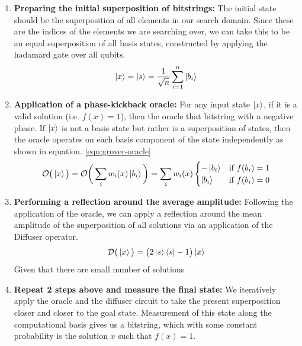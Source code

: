 \begin{enumerate}
    \item \textbf{Preparing the initial superposition of bitstrings:} The initial state should be the superposition of all elements in our search domain. Since these are the indices of the elements we are searching over, we can take this to be an equal superposition of all basis states, constructed by applying the hadamard gate over all qubits.
    \begin{equation}
        \ket{x} = \ket{s} = \frac{1}{\sqrt{n}} \sum_{i=1}^{n} \ket{b_i}
    \end{equation}

    \item \textbf{Application of a phase-kickback oracle:} For any input state $\ket{x}$, if it is a valid solution (i.e. $f(x) = 1$), then the oracle that bitstring with a negative phase. If $\ket{x}$ is not a basis state but rather is a superposition of states, then the oracle operates on each basis component of the state independently as shown in equation. \ref{eqn:grover-oracle}
    \begin{equation}\label{eqn:grover-oracle}
        \mathcal{O} \big(\ket{x} \big) = \mathcal{O}\bigg(\sum_i w_i(x) \ket{b_i} \bigg) = \sum_i w_i(x) \begin{cases}
            -\ket{b_i} & \text{if } f(b_i) = 1 \\
            \ket{b_i} & \text{if } f(b_i) = 0
        \end{cases}
    \end{equation}
    
    \item \textbf{Performing a reflection around the average amplitude:} Following the application of the oracle, we can apply a reflection around the mean amplitude of the superposition of all solutions via an application of the Diffuser operator.
    \begin{equation}
        \mathcal{D} \big(\ket{x} \big) = \big( 2 \ket{s}\bra{s} - 1 \big) \ket{x}
    \end{equation}
    Given that there are small number of solutions 
    \item \textbf{Repeat 2 steps above and measure the final state:} We iteratively apply the oracle and the diffuser circuit to take the present superposition closer and closer to the goal state. Measurement of this state along the computational basis gives us a bitstring, which with some constant probability is the solution $x$ such that $f(x) = 1$.
\end{enumerate}

